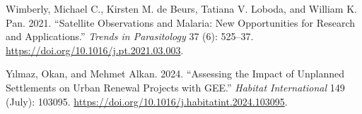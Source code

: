 \documentclass[
  letterpaper,
  DIV=11,
  numbers=noendperiod]{scrreprt}
\newlength{\cslhangindent}
\newlength{\cslentryspacingunit} %
\newenvironment{CSLReferences}[2] %
 {%
  \setlength{\parindent}{0pt}
  \ifodd #1
  \let\oldpar\par
  \def\par{\hangindent=\cslhangindent\oldpar}
  \fi
  \setlength{\parskip}{#2\cslentryspacingunit}
 }%
 {}
\begin{document}
\begin{CSLReferences}{1}{0}
\leavevmode{}%
Wimberly, Michael C., Kirsten M. de Beurs, Tatiana V. Loboda, and
William K. Pan. 2021. {``Satellite Observations and Malaria: New
Opportunities for Research and Applications.''} \emph{Trends in
Parasitology} 37 (6): 525--37.
\url{https://doi.org/10.1016/j.pt.2021.03.003}.

\leavevmode{}%
Yılmaz, Okan, and Mehmet Alkan. 2024. {``Assessing the Impact of
Unplanned Settlements on Urban Renewal Projects with GEE.''}
\emph{Habitat International} 149 (July): 103095.
\url{https://doi.org/10.1016/j.habitatint.2024.103095}.

\end{CSLReferences}
\end{document}
